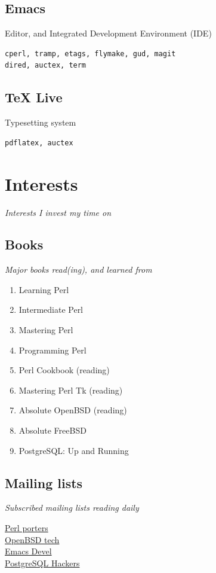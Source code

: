 \documentclass {article}
\begin{document}
    \subsection{Emacs}
    Editor, and Integrated Development Environment (IDE)
      \begin{verbatim}
cperl, tramp, etags, flymake, gud, magit
dired, auctex, term
   \end{verbatim}

    \subsection{TeX Live}
    Typesetting system
      \begin{verbatim}
pdflatex, auctex
   \end{verbatim}

  \section{Interests}
  \textit{Interests I invest my time on}

    \subsection{Books}
      \textit{Major books read(ing), and learned from}
      \begin{enumerate}
        \item{Learning Perl\cite{learning_perl}}
        \item{Intermediate Perl\cite{intermediate_perl}}
        \item{Mastering Perl\cite{mastering_perl}}
        \item{Programming Perl\cite{programming_perl}}
        \item{Perl Cookbook\cite{perl_cookbook}} (reading)
        \item{Mastering Perl Tk\cite{perl_tk}} (reading)
        \item{Absolute OpenBSD\cite{absolute_openbsd}} (reading)
        \item{Absolute FreeBSD\cite{absolute_freebsd}}
        \item{PostgreSQL: Up and Running\cite{postgresql}}
      \end{enumerate}

    \subsection{Mailing lists}
      \textit{Subscribed mailing lists reading daily}
      \begin{description}
        \item[\href{https://lists.perl.org/list/perl5-porters.html}{Perl porters}]
        \item[\href{https://www.openbsd.org/mail.html}{OpenBSD tech}]
        \item[\href{https://lists.gnu.org/mailman/listinfo/emacs-devel}{Emacs Devel}]
        \item[\href{https://www.postgresql.org/list/pgsql-hackers/}{PostgreSQL Hackers}]
      \end{description}
\end{document}
